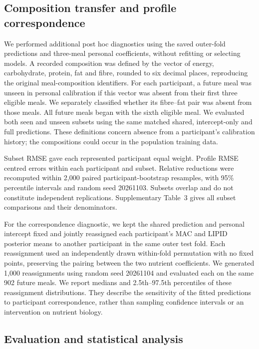 \documentclass[pdflatex,sn-nature]{sn-jnl}
\theoremstyle{thmstyleone}
\theoremstyle{thmstyletwo}
\theoremstyle{thmstylethree}
\begin{document}
\subsection{Composition transfer and profile correspondence}

We performed additional post hoc diagnostics using the saved outer-fold predictions and three-meal personal coefficients, without refitting or selecting models. A recorded composition was defined by the vector of energy, carbohydrate, protein, fat and fibre, rounded to six decimal places, reproducing the original meal-composition identifiers. For each participant, a future meal was unseen in personal calibration if this vector was absent from their first three eligible meals. We separately classified whether its fibre--fat pair was absent from those meals. All future meals began with the sixth eligible meal. We evaluated both seen and unseen subsets using the same matched shared, intercept-only and full predictions. These definitions concern absence from a participant's calibration history; the compositions could occur in the population training data.

Subset RMSE gave each represented participant equal weight. Profile RMSE centred errors within each participant and subset. Relative reductions were recomputed within 2,000 paired participant-bootstrap resamples, with 95\% percentile intervals and random seed 20261103. Subsets overlap and do not constitute independent replications. Supplementary Table~3 gives all subset comparisons and their denominators.

For the correspondence diagnostic, we kept the shared prediction and personal intercept fixed and jointly reassigned each participant's MAC and LIPID posterior means to another participant in the same outer test fold. Each reassignment used an independently drawn within-fold permutation with no fixed points, preserving the pairing between the two nutrient coefficients. We generated 1,000 reassignments using random seed 20261104 and evaluated each on the same 902 future meals. We report medians and 2.5th--97.5th percentiles of these reassignment distributions. They describe the sensitivity of the fitted predictions to participant correspondence, rather than sampling confidence intervals or an intervention on nutrient biology.

\subsection{Evaluation and statistical analysis}
\end{document}
